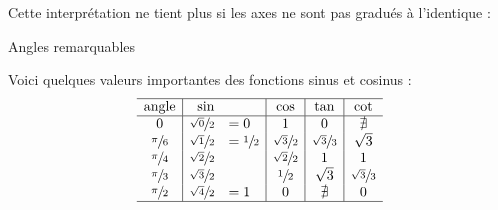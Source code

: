 \documentclass[french,xcolor=svgnames]{beamer}
\begin{document}
\begin{frame}
  \begin{remark*}
    Cette interprétation ne tient plus si les axes ne sont
    pas gradués à l'identique :
  \end{remark*}
  \begin{center}
    \def\xmax{4}%
    \def\ymax{3}%
  \end{center}
\end{frame}

\begin{frame}{Angles remarquables}

Voici quelques valeurs importantes des fonctions sinus et cosinus :
\begin{equation}\label{valeurscossin}
  \begin{array}{c|rl|c|c|c}
    \hline 
    \text{angle} & \sin & & \cos & \tan & \cot\\
    \hline
    0          &\sfrac {\sqrt 0}{2}& = 0& 1 & 0 & \nexists\\
    \sfrac \pi 6&\sfrac {\sqrt 1}{2}& = \sfrac12 &\sfrac {\sqrt 3}{2} &\sfrac {\sqrt 3}{3}& \sqrt 3\\
    \sfrac \pi 4&\sfrac {\sqrt 2}{2}& & \sfrac {\sqrt 2}{2} & 1 &1\\  
    \sfrac \pi 3&\sfrac {\sqrt 3}{2}& & \sfrac 1 2 &\sqrt 3 & \sfrac {\sqrt 3}{3}\\ 
    \sfrac \pi 2&\sfrac {\sqrt 4}{2}& = 1&0&\nexists&0\\
    \hline
  \end{array} 
\end{equation}
\end{frame}
\end{document}
